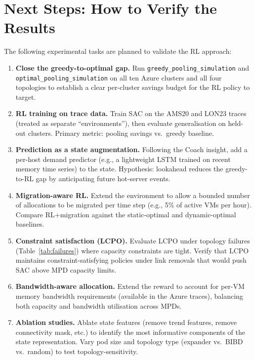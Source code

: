 \documentclass[11pt]{article}
\begin{document}
\section{Next Steps: How to Verify the Results}
\label{sec:next_steps}

The following experimental tasks are planned to validate the RL approach:

\begin{enumerate}
    \item \textbf{Close the greedy-to-optimal gap.}
    Run \texttt{greedy\_pooling\_simulation} and \texttt{optimal\_pooling\_simulation}
    on all ten Azure clusters and all four topologies to establish a clear
    per-cluster savings budget for the RL policy to target.

    \item \textbf{RL training on trace data.}
    Train SAC on the AMS20 and LON23 traces (treated as separate
    ``environments''), then evaluate generalisation on held-out clusters.
    Primary metric: pooling savings vs.\ greedy baseline.

    \item \textbf{Prediction as a state augmentation.}
    Following the Coach insight, add a per-host demand predictor (e.g., a
    lightweight LSTM trained on recent memory time series) to the state.
    Hypothesis: lookahead reduces the greedy-to-RL gap by anticipating
    future hot-server events.

    \item \textbf{Migration-aware RL.}
    Extend the environment to allow a bounded number of allocations to be
    migrated per time step (e.g., 5\% of active VMs per hour).  Compare
    RL+migration against the static-optimal and dynamic-optimal baselines.

    \item \textbf{Constraint satisfaction (LCPO).}
    Evaluate LCPO under topology failures (Table~\ref{tab:failures}) where
    capacity constraints are tight.  Verify that LCPO maintains
    constraint-satisfying policies under link removals that would push SAC
    above MPD capacity limits.

    \item \textbf{Bandwidth-aware allocation.}
    Extend the reward to account for per-VM memory bandwidth requirements
    (available in the Azure traces), balancing both capacity and bandwidth
    utilisation across MPDs.

    \item \textbf{Ablation studies.}
    Ablate state features (remove trend features, remove connectivity mask,
    etc.) to identify the most informative components of the state
    representation.  Vary pod size and topology type (expander vs.\ BIBD
    vs.\ random) to test topology-sensitivity.
\end{enumerate}




\end{document}

